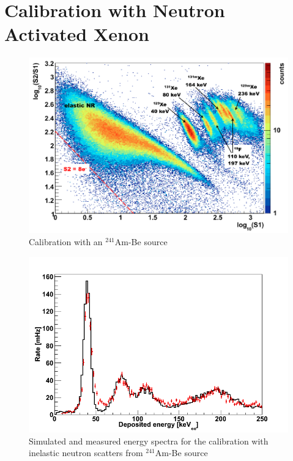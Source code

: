 \section{Calibration with Neutron Activated Xenon}
\label{AmBeCalibration}


\begin{figure}[!h]
\centering
\includegraphics[width=0.7\linewidth]{plots/AmBeCalibration/AmBe_run10_withLabels.png}
\caption{Calibration with an $^{241}$Am-Be source}
\label{figAmBeLog}
\end{figure}


\begin{figure}[!h]
\centering
\includegraphics[width=0.475\linewidth]{plots/AmBeCalibration/AmBe_run0708_dataMC_0-250keV.png}
\caption{Simulated and measured energy spectra for the calibration with inelastic neutron scatters from $^{241}$Am-Be source}
\label{figAmBeSpectra}
\end{figure}
